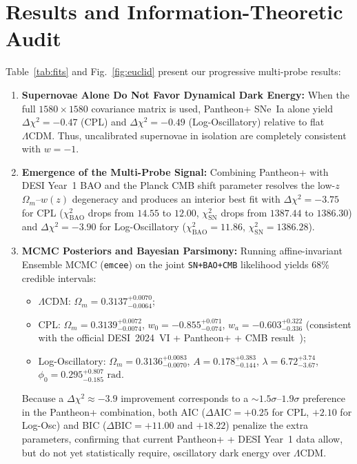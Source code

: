\documentclass[10pt,twocolumn,a4paper]{article}
\begin{document}
\section{Results and Information-Theoretic Audit}
Table~\ref{tab:fits} and Fig.~\ref{fig:euclid} present our progressive multi-probe results:
\begin{enumerate}
\item \textbf{Supernovae Alone Do Not Favor Dynamical Dark Energy:} When the full $1580\times 1580$ covariance matrix is used, Pantheon+ SNe~Ia alone yield $\Delta\chi^2 = -0.47$ (CPL) and $\Delta\chi^2 = -0.49$ (Log-Oscillatory) relative to flat $\Lambda\mathrm{CDM}$. Thus, uncalibrated supernovae in isolation are completely consistent with $w = -1$.
\item \textbf{Emergence of the Multi-Probe Signal:} Combining Pantheon+ with DESI Year~1 BAO and the Planck CMB shift parameter resolves the low-$z$ $\Omega_m$--$w(z)$ degeneracy and produces an interior best fit with $\Delta\chi^2 = -3.75$ for CPL ($\chi^2_{\mathrm{BAO}}$ drops from $14.55$ to $12.00$, $\chi^2_{\mathrm{SN}}$ drops from $1387.44$ to $1386.30$) and $\Delta\chi^2 = -3.90$ for Log-Oscillatory ($\chi^2_{\mathrm{BAO}} = 11.86$, $\chi^2_{\mathrm{SN}} = 1386.28$).
\item \textbf{MCMC Posteriors and Bayesian Parsimony:} Running affine-invariant Ensemble MCMC (\texttt{emcee}) on the joint \texttt{SN+BAO+CMB} likelihood yields $68\%$ credible intervals:
\begin{itemize}
\item $\Lambda\mathrm{CDM}$: $\Omega_m = 0.3137^{+0.0070}_{-0.0064}$;
\item CPL: $\Omega_m = 0.3139^{+0.0072}_{-0.0074}$, $w_0 = -0.855^{+0.071}_{-0.074}$, $w_a = -0.603^{+0.322}_{-0.336}$ (consistent with the official DESI~2024~VI + Pantheon+ + CMB result~\cite{desi2024});
\item Log-Oscillatory: $\Omega_m = 0.3136^{+0.0083}_{-0.0070}$, $A = 0.178^{+0.383}_{-0.144}$, $\lambda = 6.72^{+3.74}_{-3.67}$, $\phi_0 = 0.295^{+0.807}_{-0.185}\text{ rad}$.
\end{itemize}
Because a $\Delta\chi^2 \approx -3.9$ improvement corresponds to a $\sim 1.5\sigma\text{--}1.9\sigma$ preference in the Pantheon+ combination, both AIC ($\Delta\mathrm{AIC} = +0.25$ for CPL, $+2.10$ for Log-Osc) and BIC ($\Delta\mathrm{BIC} = +11.00$ and $+18.22$) penalize the extra parameters, confirming that current Pantheon+ + DESI Year~1 data allow, but do not yet statistically require, oscillatory dark energy over $\Lambda\mathrm{CDM}$.
\end{enumerate}
\end{document}
